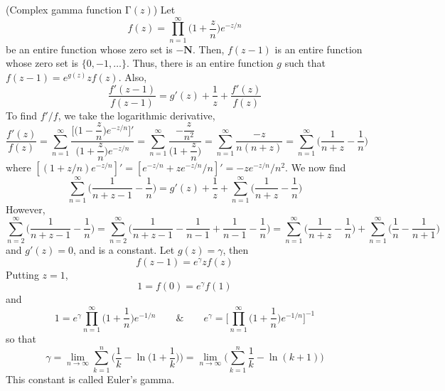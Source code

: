 \vspace{2ex}
\begin{defi}
(Complex gamma function $\mathrm{\Gamma} (z)$) Let
\[f(z)=\prod^{\infty }_{n=1}\Big(1+\dfrac{z}{n}\Big)e^{-z/n}\]
be an entire function whose zero set is $-{\bm N}$. Then, $f(z-1)$ is an entire function whose zero set is $\{0,-1,\ldots \}$. Thus, there is an entire function $g$ such that $f(z-1)=e^{g(z)}zf(z)$. Also,
\[\dfrac{f'(z-1)}{f(z-1)}=g'(z)+\dfrac{1}{z}+\dfrac{f'(z)}{f(z)}\]
To find $f'/f$, we take the logarithmic derivative,
\[\dfrac{f'(z)}{f(z)}=\sum _{n=1}^{\infty }\dfrac{\Big[\Big(1-\dfrac{z}{n}\Big)e^{-z/n}\Big]'}{\Big(1+\dfrac{z}{n}\Big)e^{-z/n}}=\sum ^{\infty }_{n=1}\dfrac{-\dfrac{z}{n^2}}{\Big(1+\dfrac{z}{n}\Big)}=\sum ^{\infty }_{n=1}\dfrac{-z}{n(n+z)}=\sum ^{\infty }_{n=1}\Big(\dfrac{1}{n+z}-\dfrac{1}{n}\Big)\]
where $[(1+z/n)e^{-z/n}]'=[e^{-z/n}+ze^{-z/n}/n]'=-ze^{-z/n}/n^2$. We now find
\[\sum ^{\infty }_{n=1}\Big(\dfrac{1}{n+z-1}-\dfrac{1}{n}\Big)=g'(z)+\dfrac{1}{z}+\sum ^{\infty }_{n=1}\Big(\dfrac{1}{n+z}-\dfrac{1}{n}\Big)\]
However,
\[\sum ^{\infty }_{n=2}\Big(\dfrac{1}{n+z-1}-\dfrac{1}{n}\Big)=\sum ^{\infty }_{n=2}\Big(\dfrac{1}{n+z-1}-\dfrac{1}{n-1}+\dfrac{1}{n-1}-\dfrac{1}{n}\Big)=\sum ^{\infty }_{n=1}\Big(\dfrac{1}{n+z}-\dfrac{1}{n}\Big)+\sum ^{\infty }_{n=1}\Big(\dfrac{1}{n}-\dfrac{1}{n+1}\Big)\]
and $g'(z)=0$, and is a constant. Let $g(z)=\gamma $, then
\[f(z-1)=e^{\gamma}zf(z)\]
Putting $z=1$, 
\[1=f(0)=e^{\gamma }f(1)\]
and
\[1=e^{\gamma }\prod^{\infty }_{n=1}\Big(1+\dfrac{1}{n}\Big)e^{-1/n}\qquad\&\qquad e^{\gamma }=\Big[\prod^{\infty }_{n=1}\Big(1+\dfrac{1}{n}\Big)e^{-1/n}\Big]^{-1}\]
so that
\[\gamma =\lim_{n\rightarrow \infty }\sum ^{n}_{k=1}\Big(\dfrac{1}{k}-\ln \Big(1+\dfrac{1}{k}\Big)\Big)=\lim _{n\rightarrow \infty }\Big(\sum ^{n}_{k=1}\dfrac{1}{k}-\ln (k+1)\Big)\]
This constant is called Euler's gamma. 
\end{defi}
\vspace{2ex}

